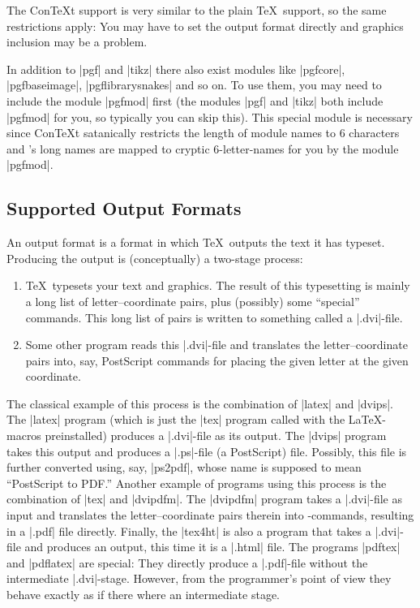 The Con\TeX t support is very similar to the plain \TeX\ support, so
the same restrictions apply: You may have to set the output
format directly and graphics inclusion may be a problem.

In addition to |pgf| and |tikz| there also exist modules like
|pgfcore|, |pgfbaseimage|, |pgflibrarysnakes| and so on. To
use them, you may need to include the module |pgfmod| first (the
modules |pgf| and |tikz| both include |pgfmod| for you, so typically
you can skip this). This special module is necessary since Con\TeX t
satanically restricts the length of module names to 6 characters
and \pgfname's long names are mapped
to cryptic 6-letter-names for you by the module |pgfmod|.





\subsection{Supported Output Formats}
\label{section-drivers}

An output format is a format in which \TeX\ outputs the text it has
typeset. Producing the output is (conceptually) a two-stage process:
\begin{enumerate}
\item
  \TeX\ typesets your text and graphics. The result of this
  typesetting is mainly a long list of letter--coordinate pairs, plus 
  (possibly) some ``special'' commands. This long list of pairs
  is written to something called a |.dvi|-file.
\item
  Some other program reads this |.dvi|-file and translates the
  letter--coordinate pairs into, say, PostScript commands for placing
  the given letter at the given coordinate.
\end{enumerate}

The classical example of this process is the combination of |latex|
and |dvips|. The |latex| program (which is just the |tex| program
called with the \LaTeX-macros preinstalled) produces a |.dvi|-file as
its output. The |dvips| program takes this output and produces a
|.ps|-file (a PostScript) file. Possibly, this file is further
converted using, say, |ps2pdf|, whose name is supposed to mean
``PostScript to PDF.'' Another example of programs using this
process is the combination of |tex| and |dvipdfm|. The |dvipdfm|
program takes a |.dvi|-file as 
input and translates the letter--coordinate pairs therein into
\pdf-commands, resulting in a |.pdf| file directly. Finally, the
|tex4ht| is also a program that takes a |.dvi|-file and produces an
output, this time it is a |.html| file. The programs |pdftex| and
|pdflatex| are special: They directly produce a |.pdf|-file without
the intermediate |.dvi|-stage. However, from the programmer's point of
view they behave exactly as if there where an intermediate stage.

